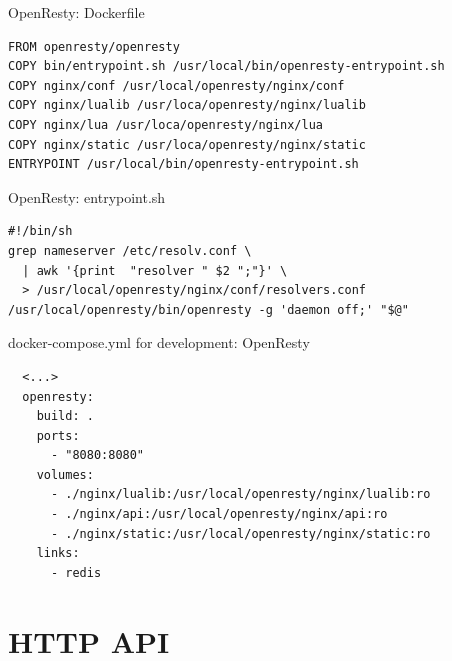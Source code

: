 \documentclass[aspectratio=169,handout,bigger]{beamer}
\begin{document}

\begin{frame}[fragile]{OpenResty: Dockerfile}
\begin{verbatim}
FROM openresty/openresty
COPY bin/entrypoint.sh /usr/local/bin/openresty-entrypoint.sh
COPY nginx/conf /usr/local/openresty/nginx/conf
COPY nginx/lualib /usr/loca/openresty/nginx/lualib
COPY nginx/lua /usr/loca/openresty/nginx/lua
COPY nginx/static /usr/loca/openresty/nginx/static
ENTRYPOINT /usr/local/bin/openresty-entrypoint.sh
\end{verbatim}
\end{frame}


\begin{frame}[fragile]{OpenResty: entrypoint.sh}
\begin{verbatim}
#!/bin/sh
grep nameserver /etc/resolv.conf \
  | awk '{print  "resolver " $2 ";"}' \
  > /usr/local/openresty/nginx/conf/resolvers.conf
/usr/local/openresty/bin/openresty -g 'daemon off;' "$@"
\end{verbatim}
\end{frame}


\begin{frame}[fragile]{docker-compose.yml for development: OpenResty}
\begin{verbatim}
  <...>
  openresty:
    build: .
    ports:
      - "8080:8080"
    volumes:
      - ./nginx/lualib:/usr/local/openresty/nginx/lualib:ro
      - ./nginx/api:/usr/local/openresty/nginx/api:ro
      - ./nginx/static:/usr/local/openresty/nginx/static:ro
    links:
      - redis
\end{verbatim}
\end{frame}


\section{HTTP API}

\end{document}

